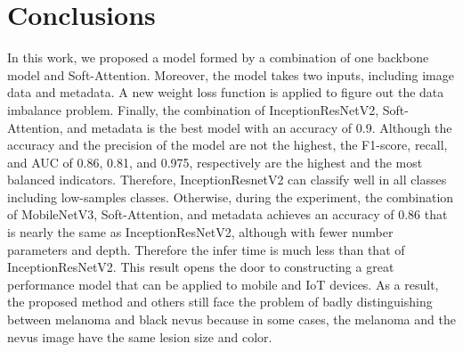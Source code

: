 \documentclass[sensors,article,accept,pdftex,moreauthors]{Definitions/mdpi}
\begin{document}
	\section{Conclusions}
	In this work, we proposed a model formed by a combination of one backbone model and Soft-Attention. Moreover, the model takes two inputs, including image data and metadata. A new weight loss function is applied to figure out the data imbalance problem. Finally, the combination of InceptionResNetV2, Soft-Attention, and metadata is the best model with an accuracy of 0.9. Although the accuracy and the precision of the model are not the highest, the F1-score, recall, and AUC of 0.86, 0.81, and 0.975, respectively are the highest and the most balanced indicators. Therefore, InceptionResnetV2 can classify well in all classes including low-samples classes. Otherwise, during the experiment, the combination of MobileNetV3, Soft-Attention, and metadata achieves an accuracy of 0.86 that is nearly the same as InceptionResNetV2, although with fewer number parameters and depth. Therefore the infer time is much less than that of  InceptionResNetV2. This result opens the door to constructing a great performance model that can be applied to mobile and IoT devices. {As a result, the proposed method and others still face the problem of badly distinguishing between melanoma and black nevus because in some cases, the melanoma and the nevus image have the same lesion size and color.}
	\vspace{6pt} 
	
	
	
	
\end{document}
